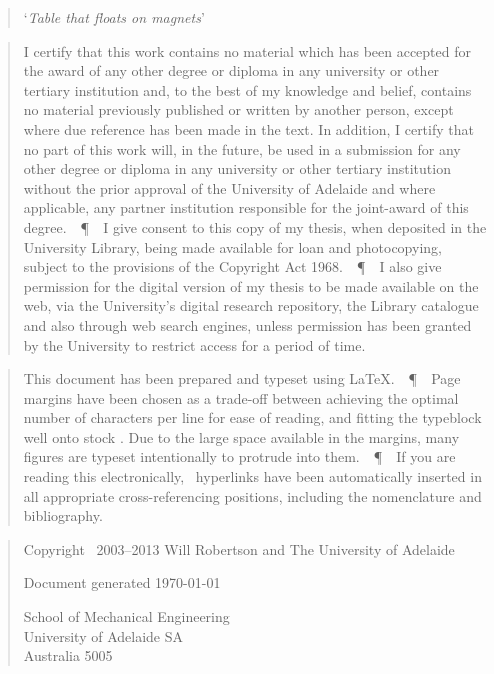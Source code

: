 \newpage
\def\PPP{\unskip~\,\textup\P~\,}
\small
\null
\begin{quote}
\centering
\Large`\textit{Table that floats on magnets}'
\end{quote}
\vfil
\begin{quote}
\nonfrenchspacing
\parfillskip=0pt
I certify that this work contains no material which has been accepted for the award of any other degree or diploma in any university or other tertiary institution and, to the best of my knowledge and belief, contains no material previously published or written by another person, except where due reference has been made in the text. In addition, I certify that no part of this work will, in the future, be used in a submission for any other degree or diploma in any university or other tertiary institution without the prior approval of the University of Adelaide and where applicable, any partner institution responsible for the joint-award of this degree.
\PPP
I give consent to this copy of my thesis, when deposited in the University Library, being made available for loan and photocopying, subject to the provisions of the Copyright Act 1968.
\PPP
I also give permission for the digital version of my thesis to be made available on the web, via the University’s digital research repository, the Library catalogue and also through web search engines, unless permission has been granted by the University to restrict access for a period of time.
\end{quote}
\vfil
\begin{quote}
\nonfrenchspacing
\parfillskip=0pt
This document has been prepared and typeset using \LaTeX{}.
\PPP
Page margins have been chosen as a trade-off between achieving the optimal number of characters per line for ease of reading, and fitting the typeblock well onto  stock \cite{bringhurst-typestyle}.
Due to the large space available in the margins, many figures are typeset intentionally to protrude into them.
\PPP
If you are reading this electronically, \PDF\ hyperlinks have been automatically inserted in all appropriate cross-referencing positions, including the nomenclature and bibliography.
\end{quote}
\vfil
\begin{quote}
  \centering
  Copyright \textcopyright\ 2003--2013 Will Robertson
  and The University of Adelaide

  \bigskip
  Document generated \today

  \bigskip
  School of Mechanical Engineering\\
  University of Adelaide SA\\
  Australia 5005\\
\end{quote}
\null
\newpage

